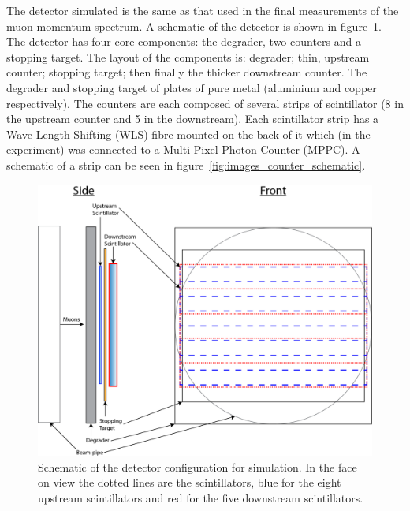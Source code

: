 The detector simulated is the same as that used in the final measurements of the muon momentum spectrum. A schematic of the detector is shown in figure~\ref{fig:images_Detector_setup_music5}. The detector has four core components: the degrader, two counters and a stopping target. The layout of the components is: degrader; thin, upstream counter; stopping target; then finally the thicker downstream counter. The degrader and stopping target of plates of pure metal (aluminium and copper respectively). The counters are each composed of several strips of scintillator (8 in the upstream counter and 5 in the downstream). Each scintillator strip has a Wave-Length Shifting (WLS) fibre mounted on the back of it which (in the experiment) was connected to a Multi-Pixel Photon Counter (MPPC). A schematic of a strip can be seen in figure~\ref{fig:images_counter_schematic}.

\begin{figure}[hptb]
  \centering
    \includegraphics[width=.9\textwidth]{images/Detector_setup_music5.png}
  \caption{Schematic of the detector configuration for simulation. In the face on view the dotted lines are the scintillators, blue for the eight upstream scintillators and red for the five downstream scintillators.}
  \label{fig:images_Detector_setup_music5}
\end{figure}

